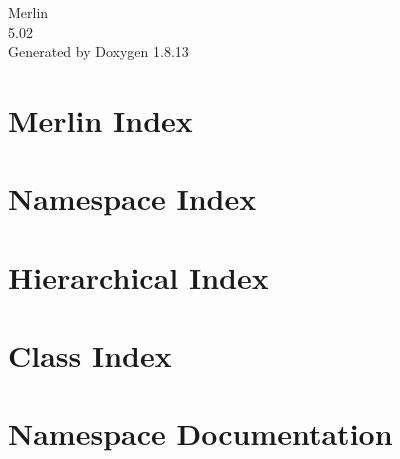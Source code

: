 \documentclass[twoside]{book}
\newcommand{\+}{\discretionary{\mbox{\scriptsize$\hookleftarrow$}}{}{}}
\newcommand{\clearemptydoublepage}{%
  \newpage{\pagestyle{empty}\cleardoublepage}%
}
\begin{document}
\hypersetup{pageanchor=false,
             bookmarksnumbered=true,
             pdfencoding=unicode
            }
\begin{titlepage}
\vspace*{7cm}
\begin{center}%
{\Large Merlin \\[1ex]\large 5.\+02 }\\
\vspace*{1cm}
{\large Generated by Doxygen 1.8.13}\\
\end{center}
\end{titlepage}
\clearemptydoublepage
{}
\tableofcontents
\clearemptydoublepage
{}
\hypersetup{pageanchor=true}

\chapter{Merlin Index}
\label{index}\hypertarget{index}{}
\chapter{Namespace Index}

\chapter{Hierarchical Index}

\chapter{Class Index}

\chapter{Namespace Documentation}


\end{document}
